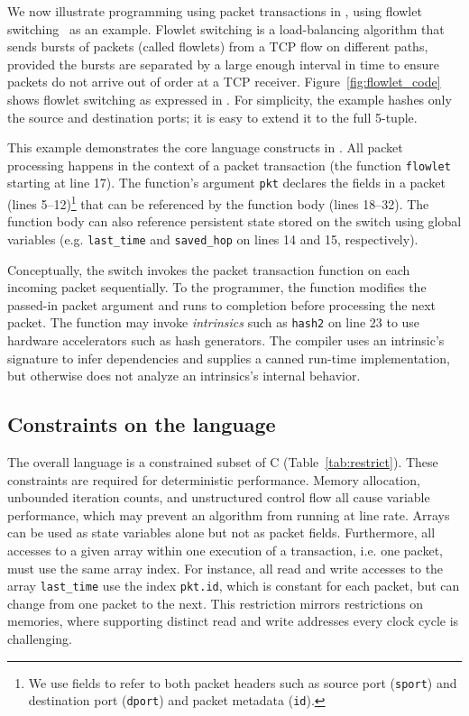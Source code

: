 We now illustrate programming using packet transactions in \pktlanguage, using
flowlet switching~\cite{flowlets} as an example. Flowlet switching is a
load-balancing algorithm that sends bursts of packets (called flowlets) from a
TCP flow on different paths, provided the bursts are separated by a large
enough interval in time to ensure packets do not arrive out of order at a TCP
receiver. Figure~\ref{fig:flowlet_code} shows flowlet switching as expressed in
\pktlanguage. For simplicity, the example hashes only the source and
destination ports; it is easy to extend it to the full 5-tuple.

This example demonstrates the core language constructs in \pktlanguage. All
packet processing happens in the context of a packet transaction (the function
\texttt{flowlet} starting at line 17). The function's argument {\tt pkt}
declares the fields in a packet (lines 5--12)\footnote{We use fields to refer
to both packet headers such as source port ({\tt sport}) and destination port
({\tt dport}) and packet metadata ({\tt id}).} that can be referenced by the
function body (lines 18--32).  The function body can also reference persistent
state stored on the switch using global variables (e.g.  \texttt{last\_time}
and \texttt{saved\_hop} on lines 14 and 15, respectively).

Conceptually, the switch invokes the packet transaction function on each
incoming packet sequentially. To the programmer, the function modifies the
passed-in packet argument and runs to completion before processing the next
packet.  The function may invoke \textit{intrinsics} such as \texttt{hash2} on
line 23 to use hardware accelerators such as hash generators.  The \pktlanguage
compiler uses an intrinsic's signature to infer dependencies and supplies a
canned run-time implementation, but otherwise does not analyze an intrinsics's
internal behavior.

\subsection{Constraints on the language}

The overall language is a constrained subset of C (Table~\ref{tab:restrict}).
These constraints are required for deterministic performance.  Memory
allocation, unbounded iteration counts, and unstructured control flow all cause
variable performance, which may prevent an algorithm from running at line rate.
Arrays can be used as state variables alone but not as packet fields.
Furthermore, all accesses to a given array within one execution of a
transaction, i.e. one packet, must use the same array index. For instance, all
read and write accesses to the array \texttt{last\_time} use the index
\texttt{pkt.id}, which is constant for each packet, but can change from one
packet to the next. This restriction mirrors restrictions on memories, where
supporting distinct read and write addresses every clock cycle is challenging.

